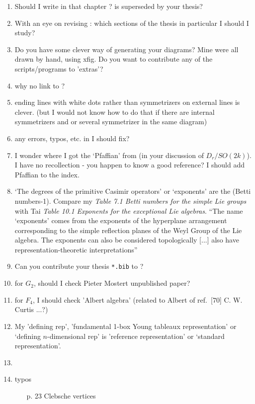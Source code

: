 \begin{enumerate}
  \item
Should I write in {\wwwgt} that chapter ? is superseded by your thesis?
  \item
With an eye on revising {\wwwgt}:
which sections of the thesis in particular I should I study?
  \item
Do you have some clever way of generating your diagrams?
  Mine were all drawn by hand, using xfig.
  Do you want to contribute any of the scripts/programs to {\wwwgt} 'extras'?
  \item
why no link to {\wwwgt}?
  \item
ending lines with white dots rather than symmetrizers on external lines
is clever. (but I would not know how to do that if there are internal
symmetrizers and or several symmetrizer in the same diagram)
  \item
any errors, typos, etc. in {\wwwgt} I should fix?
  \item
I wonder where I got the `Pfaffian' from (in your discussion of $D_r /
SO(2k)$). I have no recollection - you happen to know a good reference?
  I should add Pfaffian to the index.
  \item
`The degrees of the primitive Casimir operators' or
`exponents' are the (Betti numbers-1). Compare
my  {\em Table 7.1 Betti numbers for the simple Lie groups}
with  Tai {\em Table 10.1 Exponents for the exceptional Lie algebras}.
``The name `exponents' comes from the exponents of the hyperplane
arrangement corresponding to the simple reflection planes of the Weyl
Group of the Lie algebra. The exponents can also be considered
topologically [...] also have representation-theoretic interpretations''
  \item
Can you contribute your thesis \texttt{*.bib} to {\wwwgt}?
  \item
for $G_2$, should I check Pieter Mostert unpublished paper?
  \item
for $F_4$, I should check 'Albert algebra' (related to
{Albert} of
{\wwwgt} ref.~[70] C. W. Curtis ...?)
  \item
My 'defining rep', 'fundamental 1-box Young tableaux representation'
or `defining $n$-dimensional rep' is 'reference representation'
or `standard representation'.
  \item
  \item typos
  \begin{itemize}
    \item[p. 23] Clebsche vertices
  \end{itemize}
\end{enumerate}



